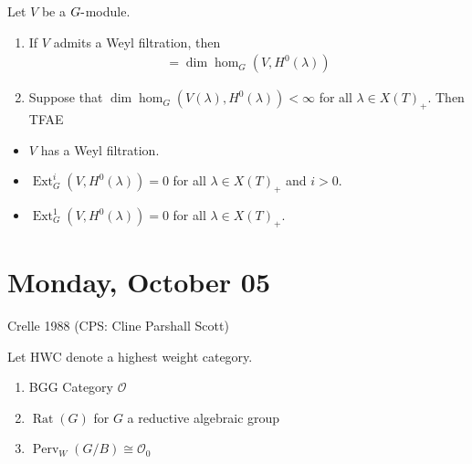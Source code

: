 \begin{theorem}

\begin{theorem}

Let \(V\) be a \(G{\hbox{-}}\)module.

\begin{enumerate}
\def\labelenumi{\alph{enumi}.}
\item
  If \(V\) admits a Weyl filtration, then
  \begin{align*}     [V: V(\lambda)] = \dim \hom_G (V, H^0(\lambda))     \end{align*}
\item
  Suppose that \(\dim \hom_G(V(\lambda), H^0(\lambda)) < \infty\) for
  all \(\lambda \in X(T)_+\). Then TFAE
\end{enumerate}

\begin{itemize}
\tightlist
\item
  \(V\) has a Weyl filtration.
\item
  \(\operatorname{Ext}^i_G(V, H^0(\lambda)) = 0\) for all
  \(\lambda \in X(T)_+\) and \(i>0\).
\item
  \(\operatorname{Ext}^1_G(V, H^0(\lambda)) = 0\) for all
  \(\lambda \in X(T)_+\).
\end{itemize}

\end{theorem}

\end{theorem}

\hypertarget{monday-october-05}{%
\section{Monday, October 05}\label{monday-october-05}}

Crelle 1988 (CPS: Cline Parshall Scott)

Let HWC denote a highest weight category.

\begin{example}

\begin{example}

\begin{enumerate}
\def\labelenumi{\arabic{enumi}.}
\item
  BGG Category \({\mathcal{O}}\)
\item
  \(\operatorname{Rat}(G)\) for \(G\) a reductive algebraic group
\item
  \(\operatorname{Perv}_W(G/B) \cong {\mathcal{O}}_0\)
\end{enumerate}

\end{example}

\end{example}

